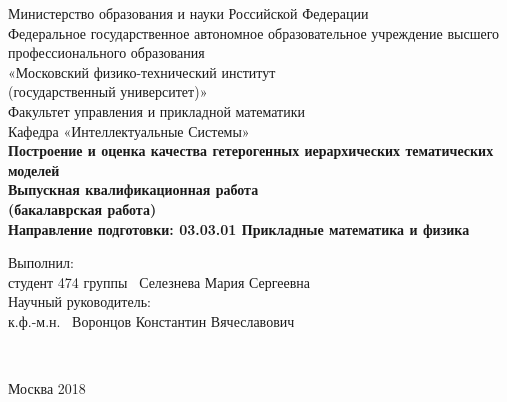 \begin{titlepage}
{
\renewcommand{\baselinestretch}{1}
\thispagestyle{empty}
\begin{center}
    \sc
        Министерство образования и науки Российской Федерации\\
        \bigskip
        Федеральное государственное автономное образовательное учреждение высшего профессионального образования \\
        «Московский физико-технический институт \\
{\rm(государственный университет)}»\\
		\bigskip
        Факультет управления и прикладной математики\\
        \bigskip
        Кафедра «Интеллектуальные Системы»\\[35mm]
    \bf\Large
        Построение и оценка качества гетерогенных иерархических
		тематических моделей \\[5mm]
    \bigskip
    \rm\normalsize
    	Выпускная квалификационная работа\\
    	 (бакалаврская работа)\\
  	\bigskip
    \rm\normalsize
       Направление подготовки: 03.03.01 Прикладные математика и физика\\[10mm]
        
       \begin{flushleft}
       Выполнил:\\
студент 474 группы \underline{\hspace{2.0in}} \, Селезнева Мария Сергеевна\\[5mm]


Научный руководитель:\\
к.ф.-м.н.  \hspace{0.85in} \underline{\hspace{2.0in}} \, Воронцов Константин Вячеславович\\[35mm]

		\end{flushleft}
\end{center}

\


\begin{center}
    Москва 2018
\end{center}
}
\end{titlepage}

